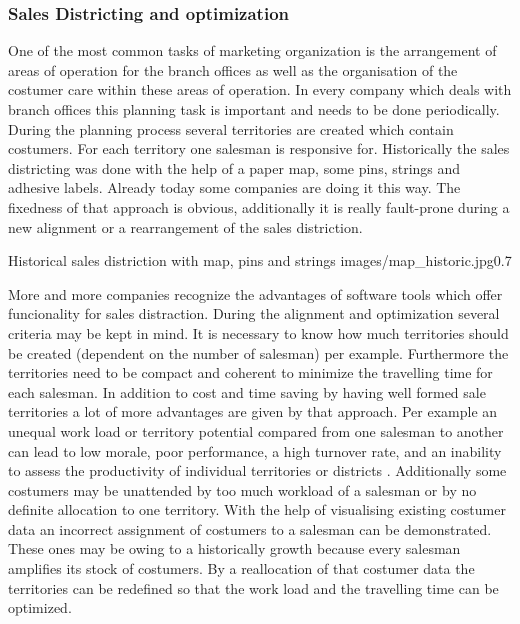\subsubsection{Sales Districting and optimization}
One of the most common tasks of marketing organization is the arrangement of areas of operation for the branch offices as well as the organisation of the costumer care within these areas of operation. In every company which deals with branch offices this planning task is important and needs to be done periodically. During the planning process several territories are created which contain costumers. For each territory one salesman is responsive for. Historically the sales districting was done with the help of a paper map, some pins, strings and adhesive labels. Already today some companies are doing it this way. The fixedness of that approach is obvious, additionally it is really fault-prone during a new alignment or a rearrangement of the sales distriction.

\begin{figurevarSize}{Historical sales distriction with map, pins and strings \cite{tappert}}{images/map_historic.jpg}{0.7}\end{figurevarSize} 

More and more companies recognize the advantages of software tools which offer funcionality for sales distraction. During the alignment and optimization several criteria may be kept in mind. It is necessary to know how much territories should be created (dependent on the number of salesman) per example. Furthermore the territories need to be compact and coherent to minimize the travelling time for each salesman.  In addition to cost and time saving by having well formed sale territories a lot of more advantages are given by that approach. Per example an unequal work load or territory potential compared from one salesman to another can lead to low morale, poor performance, a high turnover rate, and an inability to assess the productivity of individual territories or districts \cite{hessstuart}. Additionally some costumers may be unattended by too much workload of a salesman or by no definite allocation to one territory. With the help of visualising existing costumer data an incorrect assignment of costumers to a salesman can be demonstrated. These ones may be owing to a historically growth because every salesman amplifies its stock of costumers. By a reallocation of that costumer data the territories can be redefined so that the work load and the travelling time can be optimized.

